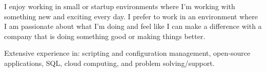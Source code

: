 \par{
I enjoy working in small or startup environments where I'm working with
something new and exciting every day.  I prefer to work in an environment where
I am passionate about what I'm doing and feel like I can make a difference with
a company that is doing something good or making things better.
}

\par{
Extensive experience in: scripting and configuration management, open-source
applications, SQL, cloud computing, and problem solving/support.
}
